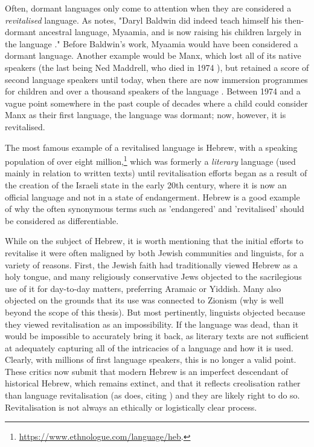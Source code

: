 Often, dormant languages only come to attention when they are considered a \textit{revitalised} language. As \citet{warner2007ethics} notes, "Daryl Baldwin did indeed teach himself his then-dormant ancestral language, Myaamia, and is now raising his children largely in the language \citep{hinton2001sleeping, leonard2004acquisition}." Before Baldwin's work, Myaamia would have been considered a dormant language. Another example would be Manx, which lost all of its native speakers (the last being Ned Maddrell, who died in 1974 \citep{wilson2008revitalization}), but retained a score of second language speakers until today, when there are now immersion programmes for children and over a thousand speakers of the language \citep{clague2009manx}. Between 1974 and a vague point somewhere in the past couple of decades where a child could consider Manx as their first language, the language was dormant; now, however, it is revitalised.

The most famous example of a revitalised language is Hebrew, with a speaking population of over eight million,\footnote{\href{https://www.ethnologue.com/language/heb}{https://www.ethnologue.com/language/heb}. } which was formerly a {\it literary} language (used mainly in relation to written texts) until revitalisation efforts began as a result of the creation of the Israeli state in the early 20th century, where it is now an official language and not in a state of endangerment. Hebrew is a good example of why the often synonymous terms such as 'endangered' and 'revitalised' should be considered as differentiable.

While on the subject of Hebrew, it is worth mentioning that the initial efforts to revitalise it were often maligned by both Jewish communities and linguists, for a variety of reasons. First, the Jewish faith had traditionally viewed Hebrew as a holy tongue, and many religiously conservative Jews objected to the sacrilegious use of it for day-to-day matters, preferring Aramaic or Yiddish. Many also objected on the grounds that its use was connected to Zionism (why is well beyond the scope of this thesis). But most pertinently, linguists objected because they viewed revitalisation as an impossibility. If the language was dead, than it would be impossible to accurately bring it back, as literary texts are not sufficient at adequately capturing all of the intricacies of a language and how it is used. Clearly, with millions of first language speakers, this is no longer a valid point. These critics now submit that modern Hebrew is an imperfect descendant of historical Hebrew, which remains extinct, and that it reflects creolisation rather than language revitalisation (as \citet{kornai2013digital} does, citing \citet{bickerton2016roots,izreel2003emergence}) and they are likely right to do so. Revitalisation is not always an ethically or logistically clear process.

